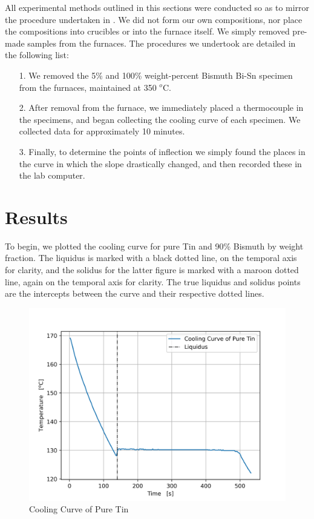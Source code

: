 \documentclass{article}
\begin{document}
All experimental methods outlined in this sections were conducted so as to mirror the procedure undertaken in \cite{manual}. We did not form our own compositions, nor place the compositions into crucibles or into the furnace itself. We simply removed pre-made samples from the furnaces. The procedures we undertook are detailed in the following list:

\begin{itemize}
    \item[1.] We removed the 5\% and 100\% weight-percent Bismuth Bi-Sn specimen from the furnaces, maintained at 350 $^o$C. 
    \item[2.] After removal from the furnace, we immediately placed a thermocouple in the specimens, and began collecting the cooling curve of each specimen. We collected data for approximately 10 minutes.
    \item[3.] Finally, to determine the points of inflection we simply found the places in the curve in which the slope drastically changed, and then recorded these in the lab computer. 
\end{itemize}


\newpage
\section{Results}
To begin, we plotted the cooling curve for pure Tin and 90\% Bismuth by weight fraction. The liquidus is marked with a black dotted line, on the temporal axis for clarity, and the solidus for the latter figure is marked with a maroon dotted line, again on the temporal axis for clarity. The true liquidus and solidus points are the intercepts between the curve and their respective dotted lines. 

\begin{figure}[!h!]
    \centering
    \includegraphics[width=0.5\linewidth]{plots/q1_00.png}
    \caption{Cooling Curve of Pure Tin}
    \label{fig:q1-00}
\end{figure}
\end{document}
